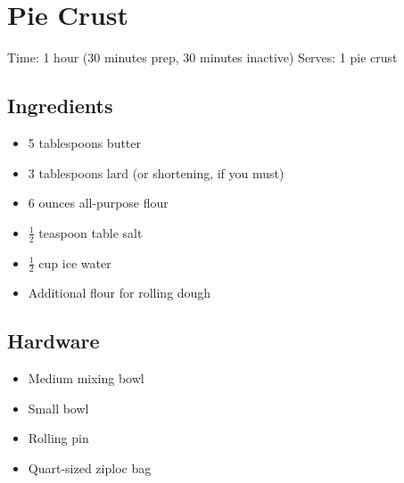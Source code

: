 \section{Pie Crust}
\label{pieCrust}
\setcounter{secnumdepth}{0}
Time: 1 hour (30 minutes prep, 30 minutes inactive)
Serves: 1 pie crust

\begin{multicols}{2}
\subsection*{Ingredients}
\begin{itemize}
    \item 5 tablespoons butter
    \item 3 tablespoons lard (or shortening, if you must)
    \item 6 ounces all-purpose flour
    \item \( \frac{1}{2} \) teaspoon table salt
    \item \( \frac{1}{2} \) cup ice water
    \item Additional flour for rolling dough
\end{itemize}

\subsection*{Hardware}
\begin{itemize}
    \item Medium mixing bowl
    \item Small bowl
    \item Rolling pin
    \item Quart-sized ziploc bag
\end{itemize}
\clearpage


\end{multicols}

